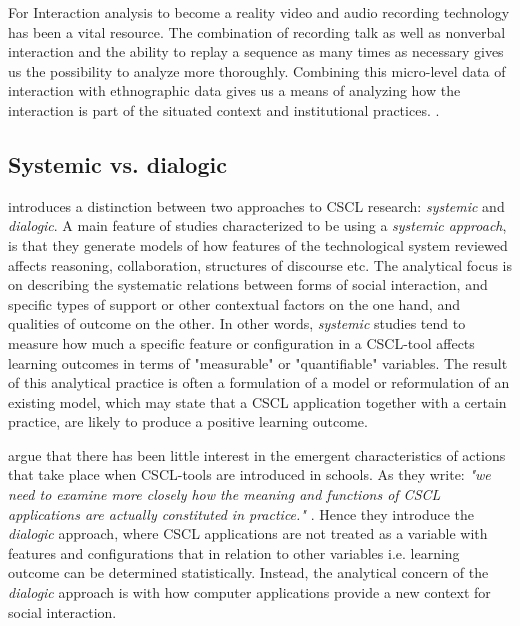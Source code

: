For Interaction analysis to become a reality video and audio recording technology has been a vital resource. The combination of recording talk as well as nonverbal interaction and the ability to replay a sequence as many times as necessary gives us the possibility to analyze more thoroughly. Combining this micro-level data of interaction with ethnographic data gives us a means of analyzing how the interaction is part of the situated context and institutional practices. \citep{furberg2009scientific}. 

\subsection{Systemic vs. dialogic}
\citet{arnseth2006approaching} introduces a distinction between two approaches to CSCL research: \emph{systemic} and \emph{dialogic}. A main feature of studies characterized to be using a \emph{systemic approach}, is that they generate models of how features of the technological system reviewed affects reasoning, collaboration, structures of discourse etc. The analytical focus is on describing the systematic relations between forms of social interaction, and specific types of support or other contextual factors on the one hand, and qualities of outcome on the other. \citep{arnseth2006approaching} In other words, \emph{systemic} studies tend to measure how much a specific feature or configuration in a CSCL-tool affects learning outcomes in terms of "measurable" or "quantifiable" variables. The result of this analytical practice is often a formulation of a model or reformulation of an existing model, which may state that a CSCL application together with a certain practice, are likely to produce a positive learning outcome.

\citeauthor*{arnseth2006approaching} argue that there has been little interest in the emergent characteristics of actions that take place when CSCL-tools are introduced in schools. As they write: \emph{"we need to examine more closely how the meaning and functions of CSCL applications are actually constituted in practice."} \citep[p. 181]{arnseth2006approaching}. Hence they introduce the \emph{dialogic} approach, where CSCL applications are not treated as a variable with features and configurations that in relation to other variables i.e. learning outcome can be determined statistically. Instead, the analytical concern  of the \emph{dialogic} approach is with how computer applications provide a new context for social interaction.

